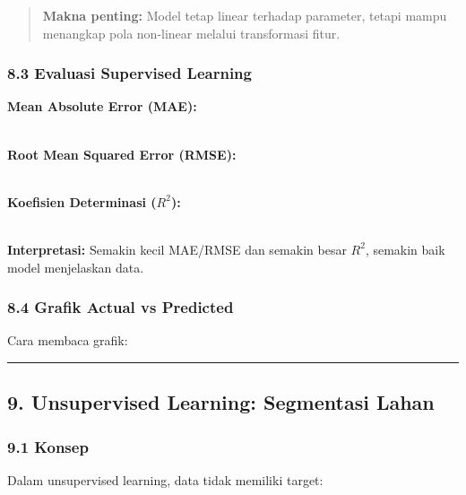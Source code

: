 \documentclass[12pt,a4paper]{article}
\begin{document}
\begin{quote}
\textbf{Makna penting:} Model tetap linear terhadap parameter, tetapi mampu menangkap pola non-linear melalui transformasi fitur.\end{quote}


\subsubsection{8.3 Evaluasi Supervised Learning}

\textbf{Mean Absolute Error (MAE):}


\\[
\begin{tabular}{|l|l|}
\hline
\text{MAE} = \frac{1}{n} \sum_{i=1}^{n} & y_i - \hat{y}_i \\
\hline
\end{tabular}
\\]


\textbf{Root Mean Squared Error (RMSE):}


\\[
\text{RMSE} = \sqrt{\frac{1}{n} \sum_{i=1}^{n} (y_i - \hat{y}_i)^2}
\\]


\textbf{Koefisien Determinasi ($R^2$):}


\\[
R^2 = 1 - \frac{SS_{\text{res}}}{SS_{\text{tot}}}
\\]


\textbf{Interpretasi:} Semakin kecil MAE/RMSE dan semakin besar $R^2$, semakin baik model menjelaskan data.


\subsubsection{8.4 Grafik Actual vs Predicted}

Cara membaca grafik:


\hrule


\subsection{9. Unsupervised Learning: Segmentasi Lahan}

\subsubsection{9.1 Konsep}

Dalam unsupervised learning, data tidak memiliki target:
\end{document}
